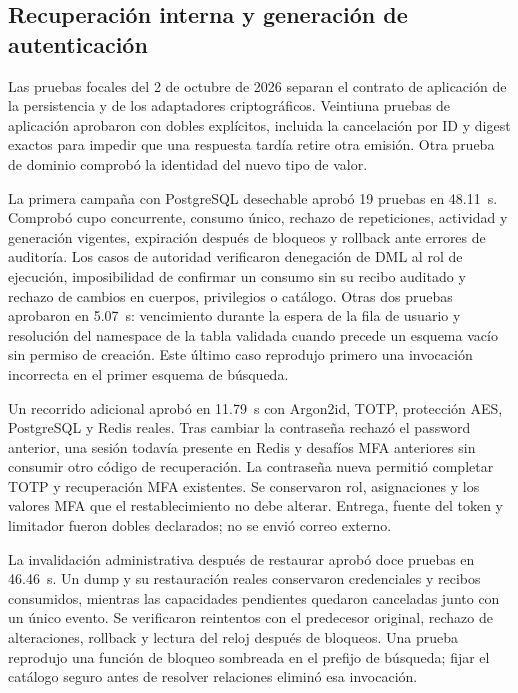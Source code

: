 \subsection{Recuperación interna y generación de autenticación}\label{sec:pruebas-recuperacion-password}

Las pruebas focales del 2 de octubre de 2026 separan el contrato de aplicación
de la persistencia y de los adaptadores criptográficos. Veintiuna pruebas de
aplicación aprobaron con dobles explícitos, incluida la cancelación por ID y
digest exactos para impedir que una respuesta tardía retire otra emisión.
Otra prueba de dominio comprobó la identidad del nuevo tipo de valor.

La primera campaña con PostgreSQL desechable aprobó 19 pruebas en 48.11~s.
Comprobó cupo concurrente, consumo único, rechazo de repeticiones, actividad y
generación vigentes, expiración después de bloqueos y rollback ante errores de
auditoría. Los casos de autoridad verificaron denegación de DML al rol de
ejecución, imposibilidad de confirmar un consumo sin su recibo auditado y
rechazo de cambios en cuerpos, privilegios o catálogo. Otras dos pruebas
aprobaron en 5.07~s: vencimiento durante la espera de la fila de usuario y
resolución del namespace de la tabla validada cuando precede un esquema vacío
sin permiso de creación. Este último caso reprodujo primero una invocación
incorrecta en el primer esquema de búsqueda.

Un recorrido adicional aprobó en 11.79~s con Argon2id, TOTP, protección AES,
PostgreSQL y Redis reales. Tras cambiar la contraseña rechazó el password
anterior, una sesión todavía presente en Redis y desafíos MFA anteriores sin
consumir otro código de recuperación. La contraseña nueva permitió completar
TOTP y recuperación MFA existentes. Se conservaron rol, asignaciones y los
valores MFA que el restablecimiento no debe alterar. Entrega, fuente del token
y limitador fueron dobles declarados; no se envió correo externo.

La invalidación administrativa después de restaurar aprobó doce pruebas en
46.46~s. Un dump y su restauración reales conservaron credenciales y recibos
consumidos, mientras las capacidades pendientes quedaron canceladas junto con un
único evento. Se verificaron reintentos con el predecesor original, rechazo de
alteraciones, rollback y lectura del reloj después de bloqueos. Una prueba
reprodujo una función de bloqueo sombreada en el prefijo de búsqueda; fijar el
catálogo seguro antes de resolver relaciones eliminó esa invocación.


